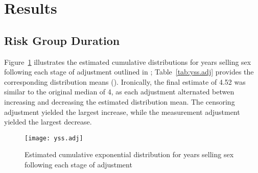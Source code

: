 \clearpage %
\section{Results}
\subsection{Risk Group Duration}\label{res.yss}
Figure~\ref{fig:yss.adj} illustrates
the estimated cumulative distributions for years selling sex
following each stage of adjustment outlined in ;
Table~\ref{tab:yss.adj} provides the corresponding distribution means (\ci).
Ironically, the final estimate of 4.52 was similar to the original median of 4,
as each adjustment alternated betwen increasing and decreasing
the estimated distribution mean.
The censoring adjustment yielded the largest increase, while
the measurement adjustment yielded the largest decrease.
\begin{figure}
  \centering\texttt{[image: yss.adj]}
  \caption{Estimated cumulative exponential distribution for years selling sex
    following each stage of adjustment}
  \label{fig:yss.adj}
\end{figure}
